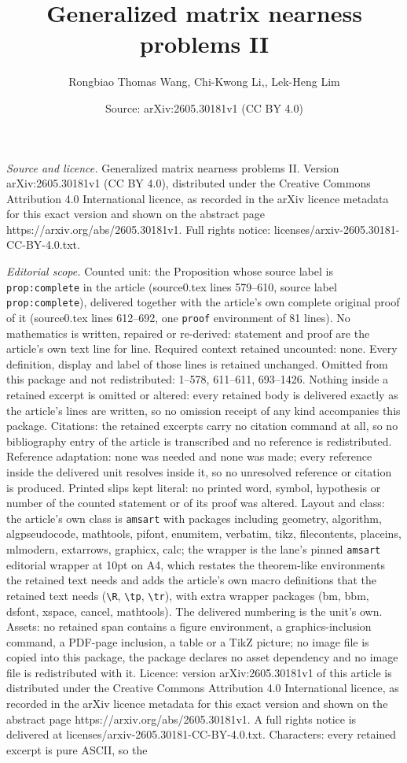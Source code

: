 \documentclass[10pt,a4paper]{amsart}
\title[Generalized matrix nearness problems II]{Generalized matrix nearness problems II}
\author{Rongbiao Thomas Wang, Chi-Kwong Li,, Lek-Heng Lim}
\date{Source: arXiv:2605.30181v1 (CC BY 4.0)}
\begin{document}
\maketitle

\noindent\emph{Source and licence.} Generalized matrix nearness problems II. Version arXiv:2605.30181v1 (CC BY 4.0), distributed under the Creative Commons Attribution 4.0 International licence, as recorded in the arXiv licence metadata for this exact version and shown on the abstract page https://arxiv.org/abs/2605.30181v1. Full rights notice: licenses/arxiv-2605.30181-CC-BY-4.0.txt.\par\smallskip

\noindent\textit{Editorial scope.} Counted unit: the Proposition whose source label is \texttt{prop:complete} in the article (source0.tex lines 579--610, source label \texttt{prop:complete}), delivered together with the article's own complete original proof of it (source0.tex lines 612--692, one \texttt{proof} environment of 81 lines). No mathematics is written, repaired or re-derived: statement and proof are the article's own text line for line. Required context retained uncounted: none. Every definition, display and label of those lines is retained unchanged. Omitted from this package and not redistributed: 1--578, 611--611, 693--1426. Nothing inside a retained excerpt is omitted or altered: every retained body is delivered exactly as the article's lines are written, so no omission receipt of any kind accompanies this package. Citations: the retained excerpts carry no citation command at all, so no bibliography entry of the article is transcribed and no reference is redistributed. Reference adaptation: none was needed and none was made; every reference inside the delivered unit resolves inside it, so no unresolved reference or citation is produced. Printed slips kept literal: no printed word, symbol, hypothesis or number of the counted statement or of its proof was altered. Layout and class: the article's own class is \texttt{amsart} with packages including geometry, algorithm, algpseudocode, mathtools, pifont, enumitem, verbatim, tikz, filecontents, placeins, mlmodern, extarrows, graphicx, calc; the wrapper is the lane's pinned \texttt{amsart} editorial wrapper at 10pt on A4, which restates the theorem-like environments the retained text needs and adds the article's own macro definitions that the retained text needs (\texttt{\textbackslash R}, \texttt{\textbackslash tp}, \texttt{\textbackslash tr}), with extra wrapper packages (bm, bbm, dsfont, xspace, cancel, mathtools). The delivered numbering is the unit's own. Assets: no retained span contains a figure environment, a graphics-inclusion command, a PDF-page inclusion, a table or a TikZ picture; no image file is copied into this package, the package declares no asset dependency and no image file is redistributed with it. Licence: version arXiv:2605.30181v1 of this article is distributed under the Creative Commons Attribution 4.0 International licence, as recorded in the arXiv licence metadata for this exact version and shown on the abstract page https://arxiv.org/abs/2605.30181v1. A full rights notice is delivered at licenses/arxiv-2605.30181-CC-BY-4.0.txt. Characters: every retained excerpt is pure ASCII, so the 
\end{document}

